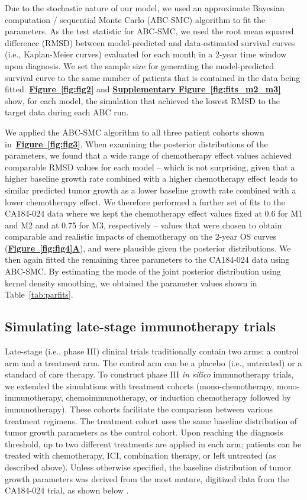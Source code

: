 \documentclass[a4paper,10pt]{article}
\newcommand{\myref}[2]{\hyperref[#1]{\bfseries Figure~\ref*{#1}#2}}
\newcommand{\mysupp}[2]{\hyperref[#1]{\bfseries Supplementary Figure~\ref*{#1}#2}}
\newcommand{\newbit}{\color{red!70!black}}
\begin{document}
{\newbit
{}
Due to the stochastic nature of our model, we used an approximate Bayesian computation / sequential
Monte Carlo (ABC-SMC) algorithm \cite{Sisson2007} to fit the parameters. 
As the test statistic for ABC-SMC, we used the root mean squared
difference (RMSD) between model-predicted and data-estimated survival curves 
(i.e., Kaplan-Meier curves) evaluated for each month in a 2-year time window 
upon diagnosis. We set the sample size for generating the model-predicted survival
curve to the same number of patients that is contained in the data being fitted.
\myref{fig:fig2}{} and \mysupp{fig:fits_m2_m3}{} show, for each model, the simulation 
that achieved the lowest RMSD to the target data during each ABC run.

We applied the ABC-SMC algorithm to all three patient cohorts shown in~\myref{fig:fig3}{}.
When examining the posterior distributions of the parameters, we found that a wide range of chemotherapy
effect values achieved comparable RMSD values for each model -- which is not surprising,
given that a higher baseline growth rate combined with a higher chemotherapy effect leads to similar
predicted tumor growth as a lower baseline growth rate combined with a lower chemotherapy effect.
We therefore performed a further set of fits to the CA184-024 data where we kept the chemotherapy effect
values fixed at 0.6 for M1 and M2 and at 0.75 for M3, respectively -- values that were chosen to obtain
comparable and realistic impacts of chemotherapy on the 2-year OS curves (\myref{fig:fig4}{A}), and were
plausible given the posterior distributions. We then again fitted the remaining three parameters to 
the CA184-024 data using ABC-SMC. By estimating the mode of the joint posterior distribution using
kernel density smoothing, we obtained the parameter values shown in Table~\ref{tab:parfits}.
}

\subsection*{Simulating late-stage immunotherapy trials}
Late-stage (i.e., phase III) clinical trials traditionally contain two arms: a
control arm and a treatment arm. The control arm can be a placebo (i.e.,
untreated) or a standard of care therapy. To construct phase III \emph{in silico}
immunotherapy trials, we extended the simulations with treatment cohorts
(mono-chemotherapy, mono-immunotherapy, chemoimmunotherapy, or induction
chemotherapy followed by immunotherapy). These cohorts facilitate the
comparison between various treatment regimens. The treatment cohort uses the same
baseline distribution of tumor growth parameters as the control cohort. Upon reaching the diagnosis
threshold, up to two different treatments are applied in each arm; patients can be treated
with chemotherapy, ICI, combination therapy, or left untreated (as described above). 
Unless otherwise specified, the baseline distribution of tumor growth parameters was
derived from the most mature, digitized data from the CA184-024 trial, as shown below
\cite{Maio2015}. 
\end{document}
